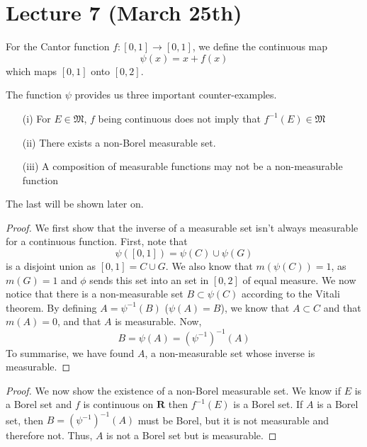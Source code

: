 \section{Lecture 7 (March 25th)}
\begin{defi}
For the Cantor function $f:[0,1]\rightarrow [0,1]$, we define the continuous map
\[\psi (x)=x+f(x)\]
which maps $[0,1]$ onto $[0,2]$.
\end{defi}
\vspace{2ex}
\begin{thm}
The function $\psi $ provides us three important counter-examples.
\begin{itemize}
	\item[(i)] For $E\in \mathfrak{M}$, $f$ being continuous does not imply that $f^{-1}(E)\in \mathfrak{M}$
	\item[(ii)] There exists a non-Borel measurable set. 
	\item[(iii)] A composition of measurable functions may not be a non-measurable function
\end{itemize}
The last will be shown later on.
\end{thm}
\vspace{2ex}
\begin{proof}
We first show that the inverse of a measurable set isn't always measurable for a continuous function. First, note that 
\[\psi([0,1])=\psi (C)\cup \psi (G)\]
is a disjoint union as $[0,1]=C\cup G$. We also know that $m(\psi (C))=1$, as $m(G)=1$ and $\phi $ sends this set into an set in $[0,2]$ of equal measure. We now notice that there is a non-measurable set $B\subset \psi (C)$ according to the Vitali theorem. By defining $A=\psi ^{-1}(B)$ ($\psi (A)=B$), we know that $A\subset C$ and that $m(A)=0$, and that $A$ is measurable. Now,  
\[B=\psi (A)=(\psi ^{-1})^{-1}(A)\]
To summarise, we have found $A$, a non-measurable set whose inverse is measurable. 
\end{proof}
\vspace{2ex}
\begin{proof}
We now show the existence of a non-Borel measurable set. We know if $E$ is a Borel set and $f$ is continuous on ${\bm R}$ then $f^{-1}(E)$ is a Borel set. If $A$ is a Borel set, then $B=(\psi ^{-1})^{-1}(A)$ must be Borel, but it is not measurable and therefore not. Thus, $A$ is not a Borel set but is measurable.
\end{proof}
\vspace{2ex}
